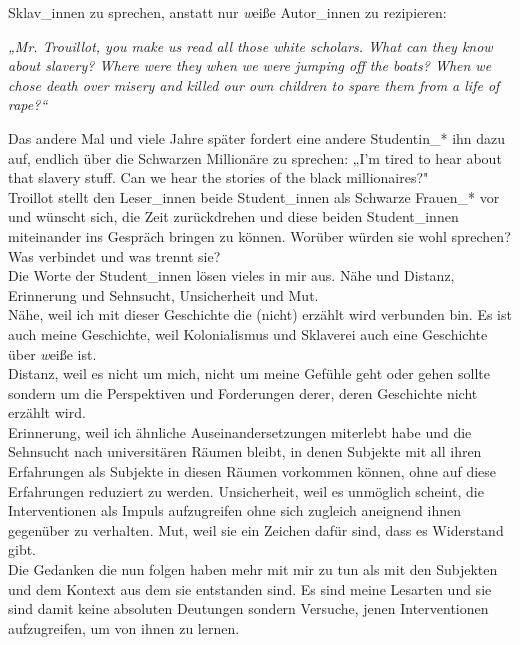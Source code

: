 Sklav\_innen zu sprechen, anstatt nur \textit{w}eiße Autor\_innen zu
rezipieren:
\begin{myenv}
  \textit{„Mr. Trouillot, you make us read all those white scholars. What can
they know about slavery? Where were they when we were jumping off the boats?
When we chose death over misery and killed our own children to spare them from
a life of rape?“\footnotemark{}}
\end{myenv}
Das andere Mal und viele Jahre später fordert eine andere
Studentin\_* ihn dazu auf, endlich über die Schwarzen Millionäre zu sprechen:
„I'm tired to hear about that slavery stuff. Can we hear the stories of the
black millionaires?"\footnotemark{}\\
Troillot stellt den Leser\_innen beide Student\_innen als Schwarze Frauen\_* vor
und wünscht sich, die Zeit zurückdrehen und diese beiden Student\_innen
miteinander ins Gespräch bringen zu können. Worüber würden sie wohl sprechen?
Was verbindet und was trennt sie?\\

\noindent Die Worte der Student\_innen lösen vieles in mir aus. Nähe und Distanz,
Erinnerung und Sehnsucht, Unsicherheit und Mut.\\
Nähe, weil ich mit dieser
Geschichte die (nicht) erzählt wird verbunden bin. Es ist auch meine
Geschichte, weil Kolonialismus und Sklaverei auch eine Geschichte über
\textit{w}eiße ist.\\
Distanz, weil es nicht um mich, nicht um meine Gefühle
geht oder gehen sollte sondern um die Perspektiven und Forderungen derer, deren
Geschichte nicht erzählt wird.\\
Erinnerung, weil ich ähnliche
Auseinandersetzungen miterlebt habe und die Sehnsucht nach universitären Räumen
bleibt, in denen Subjekte mit all ihren Erfahrungen als Subjekte in diesen
Räumen vorkommen können, ohne auf diese Erfahrungen reduziert zu werden.
Unsicherheit, weil es unmöglich scheint, die Interventionen als Impuls
aufzugreifen ohne sich zugleich aneignend ihnen gegenüber zu verhalten.  Mut,
weil sie ein Zeichen dafür sind, dass es Widerstand gibt.\\

\noindent Die Gedanken die nun
folgen haben mehr mit mir zu tun als mit den Subjekten und dem Kontext aus dem
sie entstanden sind. Es sind meine Lesarten und sie sind damit keine absoluten
Deutungen sondern Versuche, jenen Interventionen aufzugreifen, um von ihnen zu
lernen.\\

